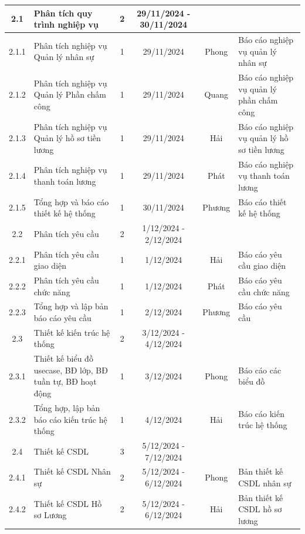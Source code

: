 \begin{longtable}{|c|p{3cm}|c|c|c|p{2.8cm}|}
    2.1 & Phân tích quy trình nghiệp vụ & 2 & 29/11/2024 - 30/11/2024 & \hspace{0pt} & \hspace{0pt}\\ \hline
    2.1.1 & Phân tích nghiệp vụ Quản lý nhân sự & 1 & 29/11/2024 & Phong & Báo cáo nghiệp vụ quản lý nhân sự \\ \hline
    2.1.2 & Phân tích nghiệp vụ Quản lý Phần chấm công & 1 & 29/11/2024 & Quang & Báo cáo nghiệp vụ quản lý phần chấm công \\ \hline
    2.1.3 & Phân tích nghiệp vụ Quản lý hồ sơ tiền lương & 1 & 29/11/2024 & Hải & Báo cáo nghiệp vụ quản lý hồ sơ tiền lương \\ \hline
    2.1.4 & Phân tích nghiệp vụ thanh toán lương & 1 & 29/11/2024 & Phát & Báo cáo nghiệp vụ thanh toán lương \\ \hline
    2.1.5 & Tổng hợp và báo cáo thiết kế hệ thống & 1 & 30/11/2024 & Phương & Báo cáo thiết kế hệ thống \\ \hline
    2.2 & Phân tích yêu cầu & 2 & 1/12/2024 - 2/12/2024 & \hspace{0pt} & \hspace{0pt}\\ \hline
    2.2.1 & Phân tích yêu cầu giao diện & 1 & 1/12/2024 & Hải & Báo cáo yêu cầu giao diện \\ \hline
    2.2.2 & Phân tích yêu cầu chức năng & 1 & 1/12/2024 & Phát & Báo cáo yêu cầu chức năng \\ \hline
    2.2.3 & Tổng hợp và lập bản báo cáo yêu cầu & 1 & 2/12/2024 & Phương & Báo cáo yêu cầu \\ \hline
    2.3 & Thiết kế kiến trúc hệ thống & 2 & 3/12/2024 - 4/12/2024 & \hspace{0pt} & \hspace{0pt}\\ \hline
    2.3.1 & Thiết kế biểu đồ usecase, BĐ lớp, BĐ tuần tự, BĐ hoạt động & 1 & 3/12/2024 & Phong & Báo cáo các biểu đồ \\ \hline
    2.3.2 & Tổng hợp, lập bản báo cáo kiến trúc hệ thống & 1 & 4/12/2024 & Hải & Báo cáo kiến trúc hệ thống \\ \hline
    2.4 & Thiết kế CSDL & 3 & 5/12/2024 - 7/12/2024 & \hspace{0pt} & \hspace{0pt}\\ \hline
    2.4.1 & Thiết kế CSDL Nhân sự & 2 & 5/12/2024 - 6/12/2024 & Phong & Bản thiết kế CSDL nhân sự \\ \hline
    2.4.2 & Thiết kế CSDL Hồ sơ Lương & 2 & 5/12/2024 - 6/12/2024 & Hải & Bản thiết kế CSDL hồ sơ lương \\ \hline

\end{longtable}
